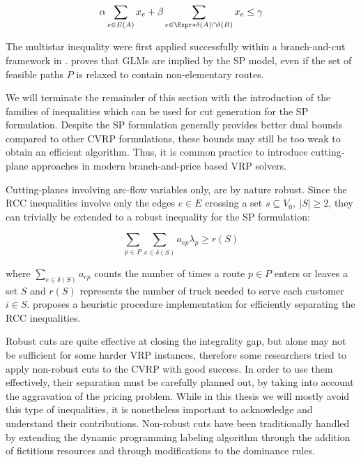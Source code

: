 \begin{equation}
	\alpha \sum_{e \in E(A)} x_e + \beta \sum_{e \in \Expr*{\delta(A) \cap \delta(B)}} x_e \le \gamma
\end{equation}

The multistar inequality were first applied successfully within a branch-and-cut framework
in \textcite{araqueg1994}.
\textcite{letchford2006} proves that GLMs are implied by the SP model,
even if the set of feasible paths $P$ is relaxed to contain non-elementary routes.

\medskip


We will terminate the remainder of this section with the introduction
of the families of inequalities which can be used for cut generation
for the SP formulation.
Despite the SP formulation generally provides better dual bounds
compared to other CVRP formulations,
these bounds may still be too weak to obtain an efficient algorithm.
Thus, it is common practice to introduce cutting-plane approaches
in modern branch-and-price based VRP solvers.

Cutting-planes involving arc-flow variables only, are by nature
robust.
Since the RCC inequalities involve only the edges $e \in E$ crossing a set $s \subseteq V_0,\ |S| \ge 2$,
they can trivially be extended to a robust inequality for the SP formulation:

\begin{equation}
	\sum_{p \in P} \sum_{e \in \delta(S)}  a_{ep} \lambda_p \ge r(S)
\end{equation}


where $\sum_{e \in \delta(S)} a_{ep}$ counts the number of times a route $p \in P$
enters or leaves a set $S$ and $r(S)$ represents the number of truck needed
to serve each customer $i \in S$.
\textcite{lysgaard2003cvrpsep} proposes a heuristic procedure implementation
for efficiently separating the RCC inequalities.

\medskip

Robust cuts are quite effective at closing the integrality gap, but alone may not
be sufficient for some harder VRP instances,
therefore some researchers tried to apply non-robust cuts to the CVRP with good success.
In order to use them effectively, their separation must be carefully
planned out, by taking into account the aggravation of the pricing problem.
While in this thesis we will mostly avoid this type of inequalities,
it is nonetheless important to acknowledge and understand their contributions.
Non-robust cuts have been traditionally handled by extending the
dynamic programming labeling algorithm
through the addition of fictitious resources and through modifications to the dominance rules.

